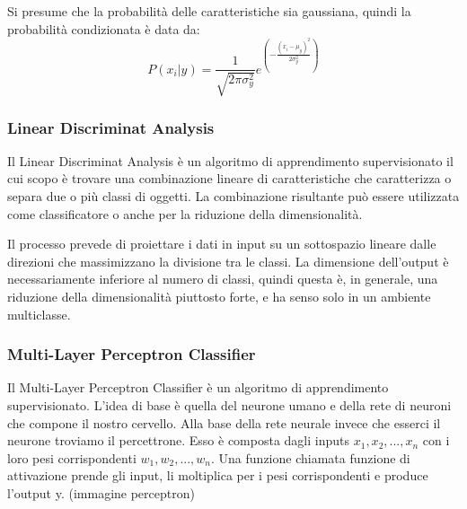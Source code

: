 \documentclass[12pt,italian]{report}
\begin{document}
Si presume che la probabilità delle caratteristiche sia gaussiana, quindi la probabilità condizionata è data da:
\begin{equation}
P(x_i|y) = \frac{1}{\sqrt{2\pi \sigma_y^2}} e^{(-\frac{(x_i-\mu_y)^2}{2\sigma_y^2})}
\end{equation}

\subsubsection{Linear Discriminat Analysis}
Il Linear Discriminat Analysis è un algoritmo di apprendimento supervisionato il cui scopo è trovare una combinazione lineare di caratteristiche che caratterizza o separa due o più classi di oggetti. La combinazione risultante può essere utilizzata come classificatore o anche per la riduzione della dimensionalità.

Il processo prevede di proiettare i dati in input su un sottospazio lineare dalle direzioni che massimizzano la divisione tra le classi. La dimensione dell'output è necessariamente inferiore al numero di classi, quindi questa è, in generale, una riduzione della dimensionalità piuttosto forte, e ha senso solo in un ambiente multiclasse.

\subsubsection{Multi-Layer Perceptron Classifier}
Il Multi-Layer Perceptron Classifier è un algoritmo di apprendimento supervisionato. L'idea di base è quella del neurone umano e della rete di neuroni che compone il nostro cervello. Alla base della rete neurale invece che esserci il neurone troviamo il percettrone. Esso è composta dagli inputs $x_1, x_2, ..., x_n$ con i loro pesi corrispondenti $w_1, w_2, ..., w_n$. Una funzione chiamata funzione di attivazione prende gli input, li moltiplica per i pesi corrispondenti e produce l'output y. (immagine perceptron)
\end{document}
